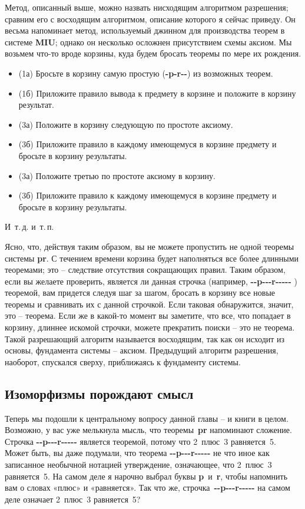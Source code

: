 \documentclass[../main.tex]{subfiles}
\begin{document}
Метод, описанный выше, можно назвать нисходящим алгоритмом разрешения; сравним его с восходящим алгоритмом, описание которого я сейчас приведу. Он весьма напоминает метод, используемый джинном для производства теорем в системе \textbf{MIU}; однако он несколько осложнен присутствием схемы аксиом. Мы возьмем что-то вроде корзины, куда будем бросать теоремы по мере их рождения.
\begin{itemize}[label={}, noitemsep, topsep=6pt]
    \item (1а) Бросьте в корзину самую простую (\textbf{-p-r-{}-}) из возможных теорем.
    \item (1б) Приложите правило вывода к предмету в корзине и положите в корзину результат.
    \item (3а) Положите в корзину следующую по простоте аксиому.
    \item (3б) Приложите правило в каждому имеющемуся в корзине предмету и бросьте в корзину результаты.
    \item (3а) Положите третью по простоте аксиому в корзину.
    \item (3б) Приложите правило к каждому имеющемуся в корзине предмету и бросьте в корзину результаты.
\end{itemize}

И~т.\,д. и~т.\,п.

Ясно, что, действуя таким образом, вы не можете пропустить не одной теоремы системы \textbf{pr}. С течением времени корзина будет наполняться все более длинными теоремами; это \--- следствие отсутствия сокращающих правил. Таким образом, если вы желаете проверить, является ли данная строчка (например, \textbf{-{}-p-{}-{}-r-{}-{}-{}-{}-} ) теоремой, вам придется следуя шаг за шагом, бросать в корзину все новые теоремы и сравнивать их с данной строчкой. Если таковая обнаружится, значит, это \--- теорема. Если же в какой-то момент вы заметите, что все, что попадает в корзину, длиннее искомой строчки, можете прекратить поиски \--- это не теорема. Такой разрешающий алгоритм называется восходящим, так как он исходит из основы, фундамента системы \--- аксиом. Предыдущий алгоритм разрешения, наоборот, спускался сверху, приближаясь к фундаменту системы.


\subsection{Изоморфизмы порождают смысл}

Теперь мы подошли к центральному вопросу данной главы \--- и книги в целом. Возможно, у вас уже мелькнула мысль, что теоремы~\textbf{pr} напоминают сложение. Строчка \textbf{-{}-p-{}-{}-r-{}-{}-{}-{}-} является теоремой, потому что 2~плюс~3 равняется~5. Может быть, вы даже подумали, что теорема \textbf{-{}-p-{}-{}-r-{}-{}-{}-{}-} не что иное как записанное необычной нотацией утверждение, означающее, что 2~плюс~3 равняется~5. На самом деле я нарочно выбрал буквы \textbf{p}~и~\textbf{r}, чтобы напомнить вам о словах «плюс» и «равняется». Так что же, строчка~\textbf{-{}-p-{}-{}-r-{}-{}-{}-{}-} на самом деле означает 2~плюс~3 равняется~5?
\end{document}
